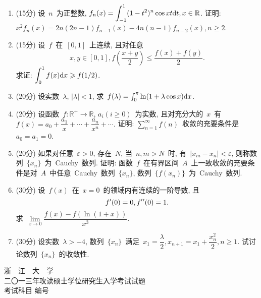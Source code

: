 \documentclass[UTF8,a4paper,11pt]{article}
\begin{document}
\begin{enumerate}
	\item (15分) 设~$n$~为正整数, $\displaystyle f_n(x)=\int_{-1}^{1}(1-t^2)^n\cos{xt}\mathrm{d}t, x\in\mathbb{R}$. 证明: $x^2f_n(x)=2n(2n-1)f_{n-1}(x)-4n(n-1)f_{n-2}(x), n\geqslant 2$.
	      \vspace{2em}
	\item (15分) 设~$f$~在~$[0,1]$~上连续, 且对任意
	      \[x,y\in[0,1],f\left(\dfrac{x+y}{2}\right)\leqslant\dfrac{f(x)+f(y)}{2}.\]
	      求证: $\displaystyle\int_0^1f(x)\mathrm{d}x\geqslant f(1/2)$.
	      \vspace{2em}
	\item (20分) 设实数~$\lambda$, $|\lambda|<1$, 求~$f(\lambda)=\int_0^{\pi}\ln(1+\lambda\cos{x})\mathrm{d}x$.
	      \vspace{2em}
	\item (20分) 设函数~$f:\mathbb{R}^{+}\to\mathbb{R}$, $a_i(i\geqslant0)$~为实数, 且对充分大的~$x$~有~$f(x)=a_0+\dfrac{a_1}{x}+\cdots+\dfrac{a_n}{x^n}+\cdots.$ 证明: $\sum\limits_{n=1}^{\infty}f(n)$~收敛的充要条件是~$a_0=a_1=0$.
	      \vspace{2em}
	\item (20分) 如果对任意~$\varepsilon>0$, 存在~$N$, 当~$n,m>N$~时, 有~$|x_m-x_n|<\varepsilon$, 则称数列~$\{x_n\}$~为~Cauchy~数列. 证明: 函数~$f$~在有界区间~$A$~上一致收敛的充要条件是对~$A$~中任意~Cauchy~数列~$\{x_n\}$, 数列~$\{f(x_n)\}$~为~Cauchy~数列.
	      \vspace{2em}
	\item (30分) 设~$f(x)$~在~$x=0$~的领域内有连续的一阶导数, 且
	      \[f\rq{}(0)=0,f\rq{}\rq{}(0)=1.\]
	      求~$\lim\limits_{x\to 0}\dfrac{f(x)-f(\ln(1+x))}{x^3}$.
	      \vspace{2em}
	\item (30分) 设实数~$\lambda>-4$, 数列~$\{x_n\}$~满足~$x_1=\dfrac{\lambda}{2}, x_{n+1}=x_1+\dfrac{x_n^2}{2}, n\geqslant 1$. 试讨论数列~$\{x_n\}$~的收敛性.
	      \vspace{2em}
\end{enumerate}

\newpage
\mbox{}
\newpage
\setcounter{page}{1}

\begin{center}
	{\Huge 浙~~江~~大~~学}\\
	\setlength{\parskip}{5pt}
	{\Large 二〇一三年攻读硕士学位研究生入学考试试题}\\
	\setlength{\parskip}{10 pt}
	{\Large 考试科目\underline{} 编号\underline{}}
\end{center}
\end{document}
